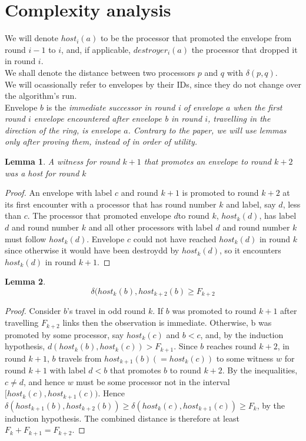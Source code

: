 \documentclass{article}
\newtheorem{lemma}{Lemma}
\begin{document}
\section{Complexity analysis}
We will denote $host_i(a)$ to be the processor that promoted the envelope from round $i-1$ to $i$, and, if applicable, $destroyer_i(a)$ the processor that dropped it in round $i$.
\\
We shall denote the distance between two processors $p$ and $q$ with $\delta(p, q)$.
\\
We will ocassionally refer to envelopes by their IDs, since they do not change over the algorithm's run.
\\
Envelope $b$ is the \it{immediate successor in round i} of envelope $a$ when the first round $i$ envelope encountered after envelope b in round $i$, travelling in the direction of the ring, is envelope $a$.
Contrary to the paper, we will use lemmas only after proving them, instead of in order of utility.
\\
\begin{lemma}\label{p1}
    A witness for round $k+1$ that promotes an envelope to round $k+2$ was a host for round $k$
\end{lemma}
\begin{proof}
    An envelope with label $c$ and round $k+1$ is promoted to round $k+2$ at its first encounter
with a processor that has round number $k$ and label, say $d$, less than $c$. The processor that promoted
envelope $d $to round $k$, $host_k(d)$, has label $d$ and round number $k$ and all other processors with label
$d$ and round number $k$ must follow $host_k(d)$. Envelope $c$ could not have reached $host_k(d)$ in round $k$
since otherwise it would have been destroydd by $host_k(d)$, so it encounters $host_k(d)$ in round $k+1$. 
\end{proof}

\begin{lemma}\label{p2}
    \[\delta(host_k(b), host_{k+2}(b) \geq F_{k+2} \]
\end{lemma}
\begin{proof}
    Consider $b$’s travel in odd round $k$. If $b$ was promoted to round $k+1$ after travelling
$F_{k+2}$ links then the observation is immediate. Otherwise, b was promoted by some processor, say
$host_k(c)$ and $b < c$, and, by the induction hypothesis, $d(host_k(b), host_k(c)) > F_{k+1}$. Since $b$ reaches
round $k + 2$, in round $k + 1$, $b$ travels from $host_{k+1}(b) (= host_k(c))$ to some witness $w$ for round $k + 1$ with label $d < b$ that promotes $b$ to round $k + 2$. By the inequalities, $c \neq d$, and hence $w$
must be some processor not in the interval $[host_k(c), host_{k+1}(c))$. Hence $\delta(host_{k+1}(b), host_{k+2}(b))
\geq \delta(host_k(c), host_{k+1}(c)) \geq F_k$, by the induction hypothesis. The combined distance is therefore at
least $F_k + F_{k+1} = F_{k+2}$. 
\end{proof}
\end{document}
